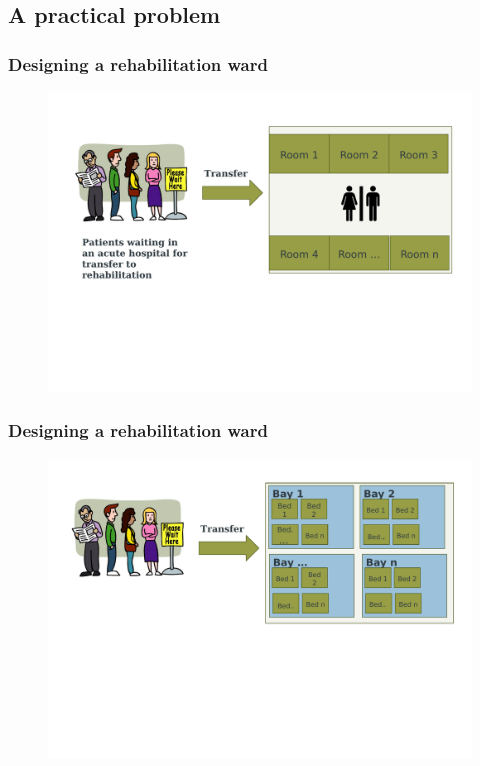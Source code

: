 \documentclass[aspectratio=169]{beamer}
\begin{document}
\subsection{A practical problem}
\begin{frame}
\frametitle{Designing a rehabilitation ward}
\begin{figure}
\includegraphics[width=0.95\linewidth]{ward1a.pdf}
\end{figure}
\end{frame}



\begin{frame}
\frametitle{Designing a rehabilitation ward}
\begin{figure}
\includegraphics[width=1.0\linewidth]{ward3a.pdf}
\end{figure}
\end{frame}
\end{document}
